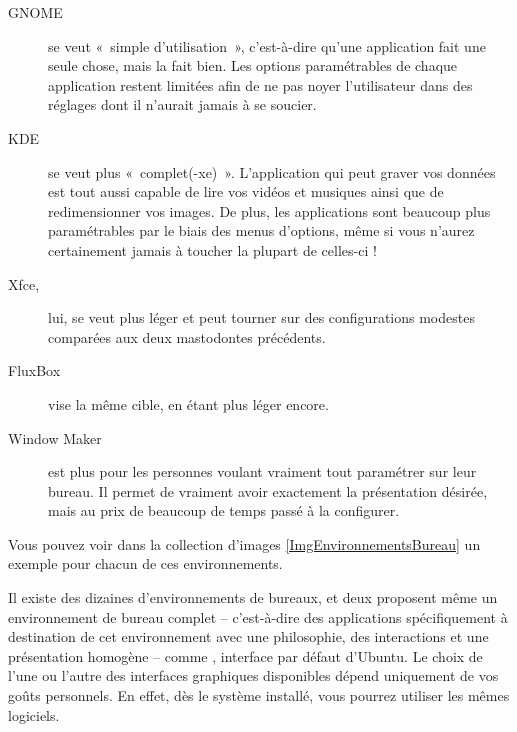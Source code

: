 \begin{description}
\item[GNOME] se veut «~simple d'utilisation~», c'est-à-dire qu'une application fait une seule chose, mais la fait bien. Les options paramétrables de chaque application restent limitées afin de ne pas noyer l'utilisateur dans des réglages dont il n'aurait jamais à se soucier.
\item[KDE] se veut plus «~complet(-xe)~». L'application qui peut graver vos données est tout aussi capable de lire vos vidéos et musiques ainsi que de redimensionner vos images. De plus, les applications sont beaucoup plus paramétrables par le biais des menus d'options, même si vous n'aurez certainement jamais à toucher la plupart de celles-ci !
\item[Xfce,] lui, se veut plus léger et peut tourner sur des configurations modestes comparées aux deux mastodontes précédents. 
\item [FluxBox] vise la même cible, en étant plus léger encore.
\item[Window Maker] est plus pour les personnes voulant vraiment tout paramétrer sur leur bureau. Il permet de vraiment avoir exactement la présentation désirée, mais au prix de beaucoup de temps passé à la configurer.
\end{description}
Vous pouvez voir dans la collection d'images \ref{ImgEnvironnementsBureau} un exemple pour chacun de ces environnements.\par
\EnvironnementsBureau
Il existe des dizaines d'environnements de bureaux, et deux proposent même un environnement de bureau complet -- c'est-à-dire des applications spécifiquement à destination de cet environnement avec une philosophie, des interactions et une présentation homogène -- comme , interface par défaut d'Ubuntu. Le choix de l'une ou l'autre des interfaces graphiques disponibles dépend uniquement de vos goûts personnels. En effet, dès le système installé, vous pourrez utiliser les mêmes logiciels.\\
